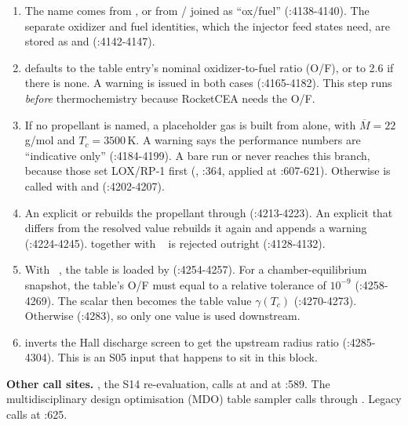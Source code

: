 \begin{enumerate}
\item The name comes from , or from / joined as ``ox/fuel'' (:4138-4140). The separate oxidizer and fuel identities, which the injector feed states need, are stored as  and  (:4142-4147).
\item {} defaults to the table entry's nominal oxidizer-to-fuel ratio (O/F), or to 2.6 if there is none. A warning is issued in both cases (:4165-4182). This step runs \emph{before} thermochemistry because RocketCEA needs the O/F.
\item If no propellant is named, a placeholder gas is built from  alone, with $\overline{M}=22$\,g/mol and $T_c=3500$\,K. A warning says the performance numbers are ``indicative only'' (:4184-4199). A bare run or  never reaches this branch, because those set LOX/RP-1 first (, :364, applied at :607-621). Otherwise  is called with  and  (:4202-4207).
\item An explicit  or  rebuilds the propellant through  (:4213-4223). An explicit  that differs from the resolved value rebuilds it again and appends a warning (:4224-4245).  together with ~ is rejected outright (:4128-4132).
\item With ~, the table is loaded by  (:4254-4257). For a chamber-equilibrium snapshot, the table's O/F must equal  to a relative tolerance of $10^{-9}$ (:4258-4269). The scalar  then becomes the table value $\gamma(T_c)$ (:4270-4273). Otherwise  (:4283), so only one value is used downstream.
\item {} inverts the Hall discharge screen to get the upstream radius ratio (:4285-4304). This is an S05 input that happens to sit in this block.
\end{enumerate}

\textbf{Other call sites.} , the S14 re-evaluation, calls  at  and  at :589. The multidisciplinary design optimisation (MDO) table sampler calls  through . Legacy  calls  at :625.

